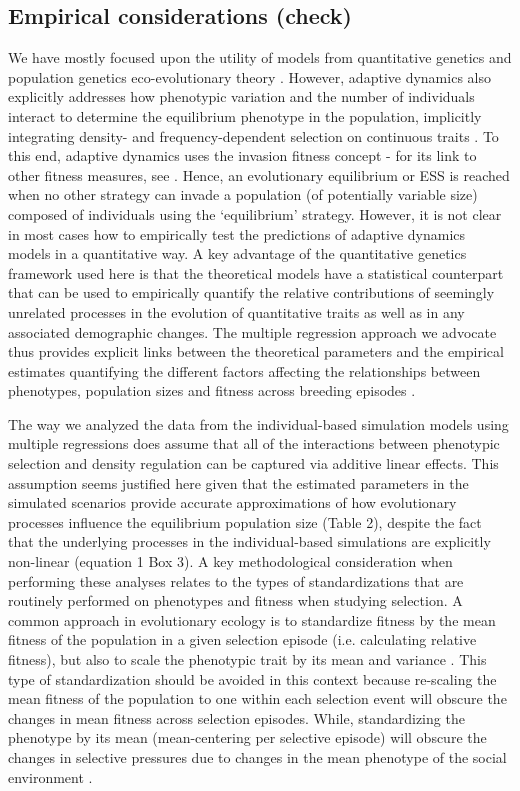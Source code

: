 \documentclass{article}
\begin{document}
\subsection{Empirical considerations (check)}
We have mostly focused upon the utility of models from quantitative genetics and population genetics  eco-evolutionary theory \citep{Engen2013, Engen2020, Lande2017, Lande2009a}. However, adaptive dynamics also explicitly addresses how phenotypic variation and the number of individuals interact to determine the equilibrium phenotype in the population, implicitly integrating density- and frequency-dependent selection on continuous traits \citep{McGill2007}. To this end, adaptive dynamics uses the invasion fitness concept - for its link to other fitness measures, see \cite{Lehmann2016}. Hence, an evolutionary equilibrium or ESS is reached when no other strategy can invade a population (of potentially variable size) composed of individuals using the 
`equilibrium' strategy. However, it is not clear in most cases how to empirically test the predictions of adaptive dynamics models in a quantitative way. A key advantage of the quantitative genetics framework used here is that the theoretical models have a statistical counterpart that can be used to empirically quantify the relative contributions of seemingly unrelated processes in the evolution of quantitative traits as well as in any associated demographic changes. The multiple regression approach we advocate thus provides explicit links between the theoretical parameters and the empirical estimates quantifying the different factors affecting the relationships between phenotypes, population sizes and fitness across breeding episodes \citep{Lande1983, Queller1992b, Wolf1999SocialSelection, Heisler1987, Goodnight1992}. 

 The way we analyzed the data from the individual-based simulation models using multiple regressions does assume that all of the interactions between phenotypic selection and density regulation can be captured via additive linear effects. This assumption seems justified here given that the estimated parameters in the simulated scenarios provide accurate approximations of how evolutionary processes influence the equilibrium population size (Table 2), despite the fact that the underlying processes in the individual-based simulations are explicitly non-linear (equation 1 Box 3). A key methodological consideration when performing these analyses relates to the types of standardizations that are routinely performed on phenotypes and fitness when studying selection. A common approach in evolutionary ecology is to standardize fitness by the mean fitness of the population in a given selection episode (i.e. calculating relative fitness), but also to scale the phenotypic trait by its mean and variance \citep{Dingemanse2021}. This type of standardization should be avoided in this context because re-scaling the mean fitness of the population to one within each selection event will obscure the changes in mean fitness across selection episodes. While, standardizing the phenotype by its mean (mean-centering per selective episode) will obscure the changes in selective pressures due to changes in the mean phenotype of the social environment \citep{Araya-Ajoy2020}.
\end{document}
